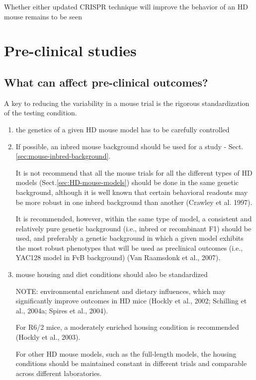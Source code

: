 Whether either updated CRISPR technique will improve the behavior of an HD mouse
remains to be seen


\chapter{Pre-clinical studies}

\section{What can affect pre-clinical outcomes?}

A key to reducing the variability in a mouse trial is the rigorous
standardization of the testing condition.

\begin{enumerate}
  \item  the genetics of a given HD mouse model has to be carefully
controlled

  \item If possible, an inbred mouse background should be used for a study -
  Sect.\ref{sec:mouse-inbred-background}.
  
It is not recommend that all the mouse trials for all the different types of HD
models (Sect.\ref{sec:HD-mouse-models}) should be done in the same genetic
background, although it is well known that certain behavioral readouts may be
more robust in one inbred background than another (Crawley et al. 1997).

It is recommended, however, within the same type of model, a consistent and
relatively pure genetic background (i.e., inbred or recombinant F1) should be
used, and preferably a genetic background in which a given model exhibits the
most robust phenotypes that will be used as preclinical outcomes (i.e., YAC128
model in FvB background) (Van Raamsdonk et al., 2007).

   \item mouse housing and diet conditions should also be standardized

NOTE: environmental enrichment and dietary influences, which may significantly
improve outcomes in HD mice (Hockly et al., 2002; Schilling et al., 2004a;
Spires et al., 2004). 

For R6/2 mice, a moderately enriched housing condition is recommended (Hockly et
al., 2003).
   
For other HD mouse models, such as the full-length models, the housing
conditions should be maintained constant in different trials and comparable
across different laboratories.
   

\end{enumerate}
